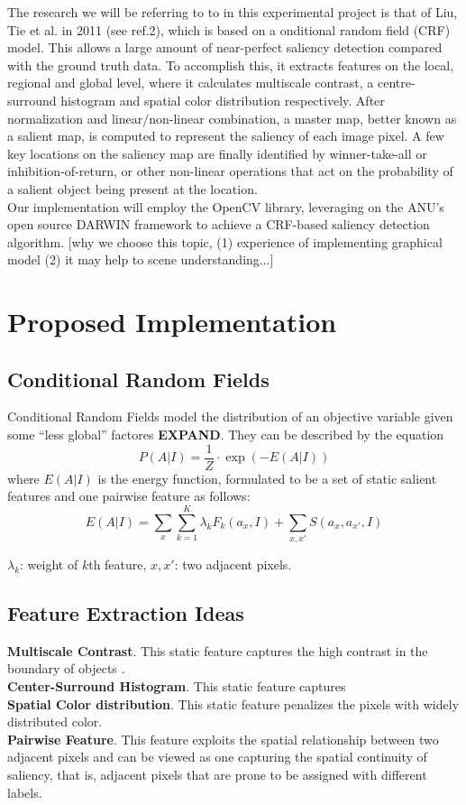 \documentclass[12pt,a4paper]{article}
\newcommand{\BOLDL}[1]{\textbf{\large #1}}
\newcommand{\htab}{\hspace*{0.63cm}}
\begin{document}
\begin{multicols}{2}
\htab The research we will be referring to to in this experimental project is that of Liu, Tie et al. in 2011 (see ref.2), which is based on a onditional random field (CRF) model.  This allows a large amount of near-perfect saliency detection compared with the ground truth data. To accomplish this, it extracts features on the local, regional and global level, where it calculates multiscale contrast, a centre-surround histogram and spatial color distribution respectively. After normalization and linear/non-linear combination, a master map, better known as a salient map, is computed to represent the saliency of each image pixel. A few key locations on the saliency map are finally identified by winner-take-all or inhibition-of-return, or other non-linear operations that act on the probability of a salient object being present at the location.\\
\htab Our implementation will employ the  OpenCV library, leveraging on the ANU's open source DARWIN framework to achieve a CRF-based saliency detection algorithm. [why we choose this topic, (1) experience of implementing graphical model (2) it may help to scene understanding...]\\
\section{Proposed Implementation}
\subsection{Conditional Random Fields}
Conditional Random Fields model the distribution of an objective variable given some ``less global'' factores \BOLDL{EXPAND}.  They can be described by the equation
    $$ P(A|I) = \frac{1}{Z} \cdot\exp(-E(A|I)) $$
where $E(A|I)$ is the energy function, formulated to be a set of static salient features and one pairwise feature as follows:
    $$ E(A|I) = \sum_{x} \sum_{k=1}^{K} \lambda_{k} F_{k}(a_{x},I)  
        + \sum_{x,x'} S(a_{x},a_{x'},I)  $$ \vspace{-0.4cm}
\begin{center} \footnotesize $\lambda_{k}$: weight of $k$th feature, $x,x'$: two adjacent pixels. \end{center} 

\subsection{Feature Extraction Ideas}
\textbf{Multiscale Contrast}. This static feature captures the high contrast in the boundary of objects . \\[0.1cm]
\textbf{Center-Surround Histogram}. This static feature captures  \\[0.1cm]
\textbf{Spatial Color distribution}. This static feature penalizes the pixels with widely distributed color. \\[0.1cm]
\textbf{Pairwise Feature}. This feature exploits the spatial relationship between two adjacent pixels and can be viewed as one capturing the spatial continuity of saliency, that is, adjacent pixels that are prone to be assigned with different labels. 

\end{multicols}
\end{document}
